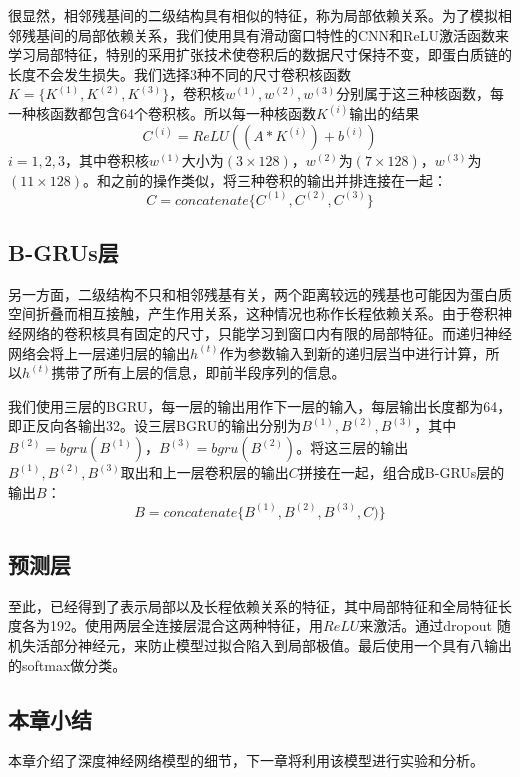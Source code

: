 \documentclass[a4paper, tikz]{article}
\begin{document}
很显然，相邻残基间的二级结构具有相似的特征，称为局部依赖关系。为了模拟相邻残基间的局部依赖关系，我们使用具有滑动窗口特性的CNN和ReLU激活函数来学习局部特征，特别的采用扩张技术使卷积后的数据尺寸保持不变，即蛋白质链的长度不会发生损失。我们选择3种不同的尺寸卷积核函数$K=\{K^{(1)},K^{(2)},K^{(3)}\}$，卷积核$w^{(1)},w^{(2)},w^{(3)}$分别属于这三种核函数，每一种核函数都包含64个卷积核。所以每一种核函数$K^{(i)}$输出的结果
\begin{equation}
	C^{(i)} = ReLU((A*K^{(i)})+b^{(i)})
\end{equation}
$i=1,2,3$，其中卷积核$w^{(1)}$大小为$(3\times 128)$，$w^{(2)}$为$(7\times 128)$，$w^{(3)}$为$(11\times 128)$。和之前的操作类似，将三种卷积的输出并排连接在一起：
\begin{equation}
	C = concatenate\{C^{(1)},C^{(2)},C^{(3)}\}
\end{equation}

\subsection{B-GRUs层}

另一方面，二级结构不只和相邻残基有关，两个距离较远的残基也可能因为蛋白质空间折叠而相互接触，产生作用关系，这种情况也称作长程依赖关系。由于卷积神经网络的卷积核具有固定的尺寸，只能学习到窗口内有限的局部特征。而递归神经网络会将上一层递归层的输出$h^{(t)}$作为参数输入到新的递归层当中进行计算，所以$h^{(t)}$携带了所有上层的信息，即前半段序列的信息。

我们使用三层的BGRU，每一层的输出用作下一层的输入，每层输出长度都为64，即正反向各输出32。设三层BGRU的输出分别为$B^{(1)},B^{(2)},B^{(3)}$，其中$B^{(2)}=bgru(B^{(1)})$，$B^{(3)}=bgru(B^{(2)})$。将这三层的输出$B^{(1)},B^{(2)},B^{(3)}$取出和上一层卷积层的输出$C$拼接在一起，组合成B-GRUs层的输出$B$：
\begin{equation}
	B = concatenate\{B^{(1)},B^{(2)},B^{(3)},C)\}
\end{equation}

\subsection{预测层}

至此，已经得到了表示局部以及长程依赖关系的特征，其中局部特征和全局特征长度各为192。使用两层全连接层混合这两种特征，用$ReLU$来激活。通过dropout\citep{li2016protein} 随机失活部分神经元，来防止模型过拟合陷入到局部极值。最后使用一个具有八输出的softmax做分类。

\subsection{本章小结}
本章介绍了深度神经网络模型的细节，下一章将利用该模型进行实验和分析。
\newpage
\end{document}
